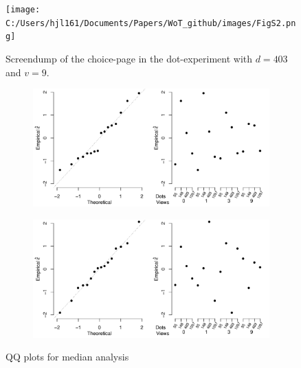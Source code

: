 \documentclass[9pt,twoside,lineno]{pnas-new}
\begin{document}
\begin{figure}
\centering
\texttt{[image: C:/Users/hjl161/Documents/Papers/WoT\_github/images/FigS2.png]}
\caption{Screendump of the choice-page in the dot-experiment with $d=403$ and $v=9$.}
\end{figure}


\begin{figure}
	\begin{subfigure}[b]{.8\textwidth}
		\includegraphics[width=\textwidth]{../plots/med_residual_h.pdf}
	\end{subfigure}
	\begin{subfigure}[b]{.8\textwidth}
		\includegraphics[width=\textwidth]{../plots/med_residual_m.pdf}	
	\end{subfigure}
	\caption{QQ plots for median analysis}
	\label{fig: qq plots median}
\end{figure}
\end{document}
